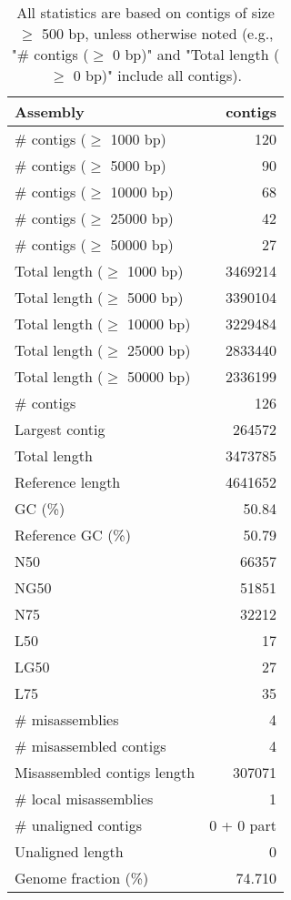 \documentclass[12pt,a4paper]{article}
\begin{document}
\begin{table}[ht]
\begin{center}
\caption{All statistics are based on contigs of size $\geq$ 500 bp, unless otherwise noted (e.g., "\# contigs ($\geq$ 0 bp)" and "Total length ($\geq$ 0 bp)" include all contigs).}
\begin{tabular}{|l*{1}{|r}|}
\hline
Assembly & contigs \\ \hline
\# contigs ($\geq$ 1000 bp) & 120 \\ \hline
\# contigs ($\geq$ 5000 bp) & 90 \\ \hline
\# contigs ($\geq$ 10000 bp) & 68 \\ \hline
\# contigs ($\geq$ 25000 bp) & 42 \\ \hline
\# contigs ($\geq$ 50000 bp) & 27 \\ \hline
Total length ($\geq$ 1000 bp) & 3469214 \\ \hline
Total length ($\geq$ 5000 bp) & 3390104 \\ \hline
Total length ($\geq$ 10000 bp) & 3229484 \\ \hline
Total length ($\geq$ 25000 bp) & 2833440 \\ \hline
Total length ($\geq$ 50000 bp) & 2336199 \\ \hline
\# contigs & 126 \\ \hline
Largest contig & 264572 \\ \hline
Total length & 3473785 \\ \hline
Reference length & 4641652 \\ \hline
GC (\%) & 50.84 \\ \hline
Reference GC (\%) & 50.79 \\ \hline
N50 & 66357 \\ \hline
NG50 & 51851 \\ \hline
N75 & 32212 \\ \hline
L50 & 17 \\ \hline
LG50 & 27 \\ \hline
L75 & 35 \\ \hline
\# misassemblies & 4 \\ \hline
\# misassembled contigs & 4 \\ \hline
Misassembled contigs length & 307071 \\ \hline
\# local misassemblies & 1 \\ \hline
\# unaligned contigs & 0 + 0 part \\ \hline
Unaligned length & 0 \\ \hline
Genome fraction (\%) & 74.710 \\ \hline

\end{tabular}
\end{center}
\end{table}
\end{document}
